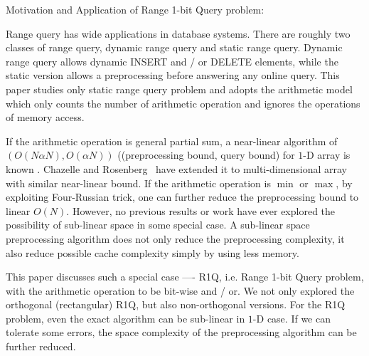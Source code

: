 Motivation and Application of Range 1-bit Query problem:

Range query has wide applications in database systems. There are
roughly two classes of range query, dynamic range query and static range
query. Dynamic range query allows dynamic INSERT and / or DELETE elements,
while the static version allows a preprocessing before answering any
online query.  This paper studies only static range query problem and
adopts the arithmetic model which only counts the number of arithmetic
operation and ignores the operations of memory access.

If the arithmetic operation is general partial sum, a near-linear
algorithm of $(O(N \alpha N), O(\alpha N))$ ((preprocessing bound,
query bound) for $1$-D array is known \cite{Yao82}. Chazelle and
Rosenberg~\cite{ChazelleRo89} have extended it to multi-dimensional
array with similar near-linear bound. If the arithmetic operation is
$\min$ or $\max$, by exploiting Four-Russian trick, one can further
reduce the preprocessing bound to linear $O(N)$. However, no previous
results or work have ever explored the possibility of sub-linear space
in some special case.  A sub-linear space preprocessing algorithm does
not only reduce the preprocessing complexity, it also reduce possible
cache complexity simply by using less memory.

This paper discusses such a special case ---- {R1Q}, i.e. Range 1-bit
Query problem, with the arithmetic operation to be bit-wise and / or.
We not only explored the orthogonal (rectangular) {R1Q}, but also
non-orthogonal versions.  For the {R1Q} problem, even the exact algorithm
can be sub-linear in $1$-D case. If we can tolerate some errors, the
space complexity of the preprocessing algorithm can be further reduced.
